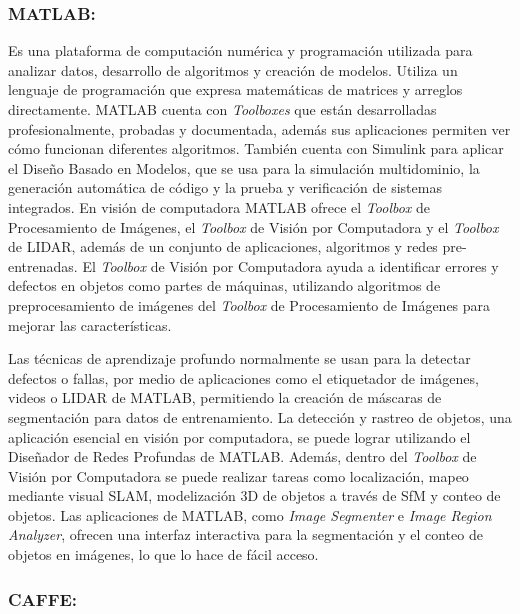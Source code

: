 \subsubsection*{MATLAB:}

Es una plataforma de computación numérica y programación utilizada para analizar datos, desarrollo de algoritmos y creación de modelos. Utiliza un lenguaje de programación que expresa matemáticas de matrices y arreglos directamente. MATLAB cuenta con \textit{Toolboxes} que están desarrolladas profesionalmente, probadas y documentada, además sus aplicaciones permiten ver cómo funcionan diferentes algoritmos. También cuenta con Simulink para aplicar el Diseño Basado en Modelos, que se usa para la simulación multidominio, la generación automática de código y la prueba y verificación de sistemas integrados. En visión de computadora MATLAB ofrece el \textit{Toolbox}  de Procesamiento de Imágenes, el \textit{Toolbox} de Visión por Computadora y el \textit{Toolbox} de LIDAR, además de un conjunto de aplicaciones, algoritmos y redes pre-entrenadas. El \textit{Toolbox} de Visión por Computadora ayuda a identificar errores y defectos en objetos como partes de máquinas, utilizando algoritmos de preprocesamiento de imágenes del \textit{Toolbox}  de Procesamiento de Imágenes para mejorar las características. \cite{MATCV}

Las técnicas de aprendizaje profundo normalmente se usan para la detectar defectos o fallas, por medio de aplicaciones como el etiquetador de imágenes, videos o LIDAR de MATLAB, permitiendo la creación de máscaras de segmentación para datos de entrenamiento. La detección y rastreo de objetos, una aplicación esencial en visión por computadora, se puede lograr utilizando el Diseñador de Redes Profundas de MATLAB. Además, dentro del \textit{Toolbox}  de Visión por Computadora se puede realizar tareas como localización, mapeo mediante visual SLAM, modelización 3D de objetos a través de SfM y conteo de objetos. Las aplicaciones de MATLAB, como \textit{Image Segmenter} e \textit{Image Region Analyzer}, ofrecen una interfaz interactiva para la segmentación y el conteo de objetos en imágenes, lo que lo hace de fácil acceso. \cite{MATCV}

\subsubsection*{CAFFE:}

